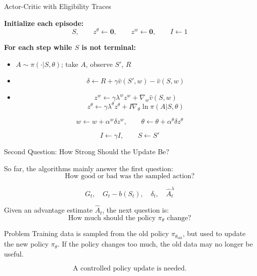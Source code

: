 \documentclass{beamer}
\begin{document}
\begin{frame}{Actor-Critic with Eligibility Traces}

\scriptsize

\textbf{Initialize each episode:}
\[
S,\qquad
z^\theta \leftarrow \mathbf{0},
\qquad
z^w \leftarrow \mathbf{0},
\qquad
I \leftarrow 1
\]

\vspace{0.1cm}

\textbf{For each step while \(S\) is not terminal:}
\begin{itemize}
    \item \(A \sim \pi(\cdot|S,\theta)\); take \(A\), observe \(S'\), \(R\)
    \item
    \[
    \delta
    \leftarrow
    R
    +
    \gamma \hat{v}(S',w)
    -
    \hat{v}(S,w)
    \]
    \item
    \[
    z^w
    \leftarrow
    \gamma\lambda^w z^w
    +
    \nabla_w \hat{v}(S,w)
    \]
    \[
    z^\theta
    \leftarrow
    \gamma\lambda^\theta z^\theta
    +
    I\nabla_\theta\ln\pi(A|S,\theta)
    \]
\end{itemize}

\[
w
\leftarrow
w
+
\alpha^w \delta z^w,
\qquad
\theta
\leftarrow
\theta
+
\alpha^\theta \delta z^\theta
\]

\[
I \leftarrow \gamma I,
\qquad
S \leftarrow S'
\]

\end{frame}


\begin{frame}{Second Question: How Strong Should the Update Be?}

\small

So far, the algorithms mainly answer the first question:
\[
\text{How good or bad was the sampled action?}
\]

\[
G_t,\quad
G_t-b(S_t),\quad
\delta_t,\quad
\widehat{A}_t^{\lambda}
\]

\vspace{0.15cm}

Given an advantage estimate \(\widehat{A}_t\), the next question is:
\[
\text{How much should the policy } \pi_\theta \text{ change?}
\]

\begin{block}{Problem}
Training data is sampled from the old policy
\(\pi_{\theta_{\mathrm{old}}}\),
but used to update the new policy \(\pi_\theta\).
If the policy changes too much, the old data may no longer be useful.
\end{block}

\[
\text{A controlled policy update is needed.}
\]

\end{frame}
\end{document}

